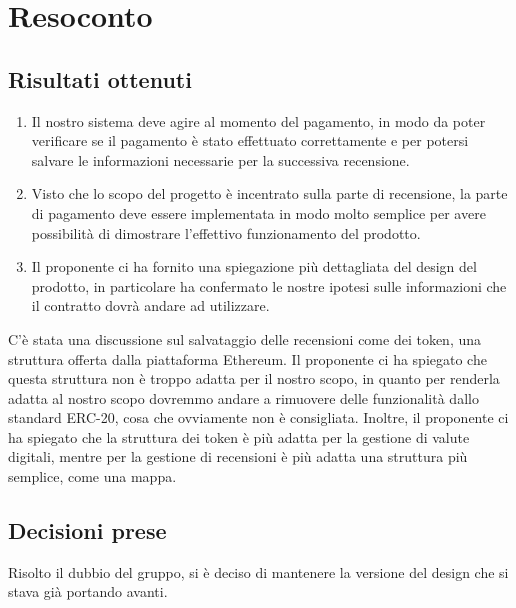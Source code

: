 \section{Resoconto}

\subsection{Risultati ottenuti}

\begin{enumerate}
      \item Il nostro sistema deve agire al momento del pagamento, in modo da poter verificare se il pagamento è stato effettuato correttamente e per potersi salvare le informazioni necessarie per la successiva recensione.
      \item Visto che lo scopo del progetto è incentrato sulla parte di recensione, la parte di pagamento deve essere implementata in modo molto semplice per avere possibilità di dimostrare l'effettivo funzionamento del prodotto.
      \item Il proponente ci ha fornito una spiegazione più dettagliata del design del prodotto, in particolare ha confermato le nostre ipotesi sulle informazioni che il contratto dovrà andare ad utilizzare. 
\end{enumerate}

C'è stata una discussione sul salvataggio delle recensioni come dei token, una struttura offerta dalla piattaforma Ethereum. Il proponente ci ha spiegato che questa struttura non è troppo adatta per il nostro scopo, in quanto per renderla adatta al nostro scopo dovremmo andare a rimuovere delle funzionalità dallo standard ERC-20, cosa che ovviamente non è consigliata. Inoltre, il proponente ci ha spiegato che la struttura dei token è più adatta per la gestione di valute digitali, mentre per la gestione di recensioni è più adatta una struttura più semplice, come una mappa.

\subsection{Decisioni prese}

Risolto il dubbio del gruppo, si è deciso di mantenere la versione del design che si stava già portando avanti.